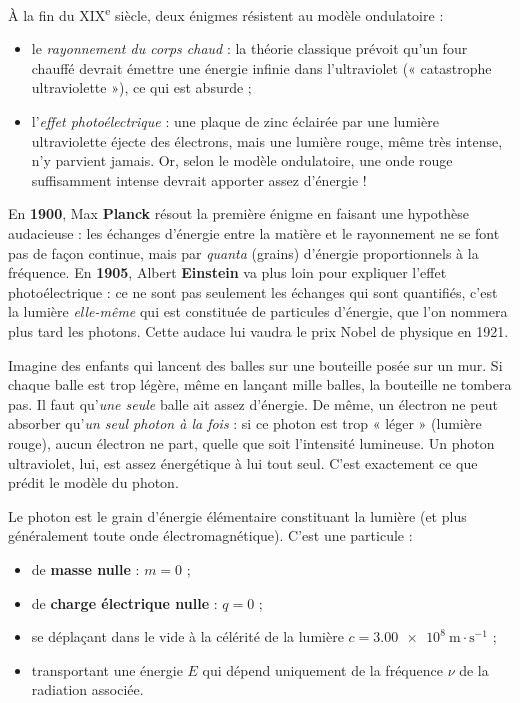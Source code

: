 \documentclass[11pt]{article}
\newcommand{\cle}[1]{{\popxbold\color{popdark}#1}}
\newcounter{popsec}
\newcounter{popsub}
\newcommand{\courssub}[1]{%
  \stepcounter{popsub}%
  \par\vspace{9pt}\noindent{\popxbold\fontsize{11.5}{13}\selectfont\color{popink}{\color{poporange}\thepopsec.\thepopsub}\hspace{6pt}#1}\par\nopagebreak\vspace{4pt}
}
\begin{document}
À la fin du XIX\textsuperscript{e} siècle, deux énigmes résistent au modèle ondulatoire :
\begin{itemize}
\item le \emph{rayonnement du corps chaud} : la théorie classique prévoit qu'un four chauffé devrait émettre une énergie infinie dans l'ultraviolet (« catastrophe ultraviolette »), ce qui est absurde ;
\item l'\emph{effet photoélectrique} : une plaque de zinc éclairée par une lumière ultraviolette éjecte des électrons, mais une lumière rouge, même très intense, n'y parvient jamais. Or, selon le modèle ondulatoire, une onde rouge suffisamment intense devrait apporter assez d'énergie !
\end{itemize}

En \textbf{1900}, Max \textbf{Planck} résout la première énigme en faisant une hypothèse audacieuse : les échanges d'énergie entre la matière et le rayonnement ne se font pas de façon continue, mais par \emph{quanta} (grains) d'énergie proportionnels à la fréquence. En \textbf{1905}, Albert \textbf{Einstein} va plus loin pour expliquer l'effet photoélectrique : ce ne sont pas seulement les échanges qui sont quantifiés, c'est la lumière \emph{elle-même} qui est constituée de particules d'énergie, que l'on nommera plus tard les \cle{photons}. Cette audace lui vaudra le prix Nobel de physique en 1921.

\begin{savaistu}
Imagine des enfants qui lancent des balles sur une bouteille posée sur un mur. Si chaque balle est trop légère, même en lançant mille balles, la bouteille ne tombera pas. Il faut qu'\emph{une seule} balle ait assez d'énergie. De même, un électron ne peut absorber qu'\emph{un seul photon à la fois} : si ce photon est trop « léger » (lumière rouge), aucun électron ne part, quelle que soit l'intensité lumineuse. Un photon ultraviolet, lui, est assez énergétique à lui tout seul. C'est exactement ce que prédit le modèle du photon.
\end{savaistu}

\courssub{Le photon : définition et caractéristiques}

\begin{definition}[Le photon]
Le \cle{photon} est le grain d'énergie élémentaire constituant la lumière (et plus généralement toute onde électromagnétique). C'est une particule :
\begin{itemize}
\item de \textbf{masse nulle} : $m = 0$ ;
\item de \textbf{charge électrique nulle} : $q = 0$ ;
\item se déplaçant dans le vide à la célérité de la lumière $c = \num{3,00e8}~\text{m}\cdot\text{s}^{-1}$ ;
\item transportant une énergie $E$ qui dépend uniquement de la fréquence $\nu$ de la radiation associée.
\end{itemize}
\end{definition}
\end{document}
